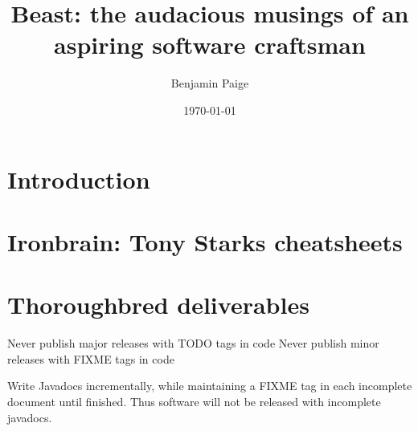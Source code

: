 \documentclass{article}
\title{Beast: the audacious musings of an aspiring software craftsman}
\author{Benjamin Paige}
\date{\today}
\begin{document}
\maketitle

\tableofcontents

\section{Introduction}

\section{Ironbrain: Tony Starks cheatsheets}

\section{Thoroughbred deliverables}
Never publish major releases with TODO tags in code
Never publish minor releases with FIXME tags in code

Write Javadocs incrementally, while maintaining a FIXME tag in each incomplete document until finished. 
Thus software will not be released with incomplete javadocs.
\end{document}
